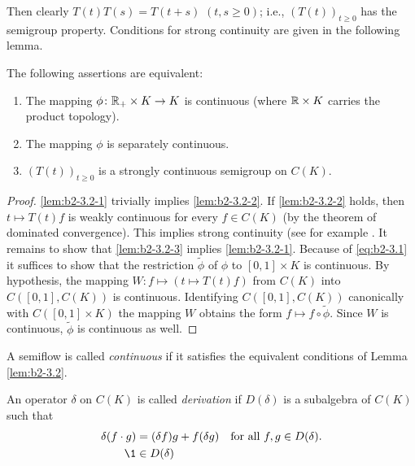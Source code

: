 Then clearly $T(t)T(s) = T(t+s)$ $(t,s\geq 0)$; i.e., $(T(t))_{t \geq 0}$ has the
semigroup property.
Conditions for strong continuity are given in the following lemma.

\begin{lemma}\label{lem:b2-3.2}
The following assertions are equivalent:
\begin{enumerate}[\upshape (a)]
\item \label{lem:b2-3.2-1}
The mapping $\phi \colon \mathbb{R}_{+} \times K \to K$ is continuous (where $\mathbb{R} \times K$ carries the product topology).
\item \label{lem:b2-3.2-2}
The mapping $\phi$ is separately continuous.
\item \label{lem:b2-3.2-3}
$(T(t))_{t \geq 0}$ is a strongly continuous semigroup on $C(K)$.
\end{enumerate}
\end{lemma}

\begin{proof}
\ref{lem:b2-3.2-1} trivially implies \ref{lem:b2-3.2-2}.
If \ref{lem:b2-3.2-2} holds, then $t \mapsto T(t)f$ is weakly continuous for every $f \in C(K)$ (by the theorem of dominated convergence).
This implies strong continuity (see for example \citet[Proposition 1.23]{davies:1980}.
It remains to show that \ref{lem:b2-3.2-3} implies \ref{lem:b2-3.2-1}.
Because of \eqref{eq:b2-3.1} it suffices to show that the restriction $\tilde{\phi}$ of $\phi$ to $[0,1] \times K$ is continuous.
By hypothesis, the mapping $W \colon f \mapsto (t \mapsto T(t)f)$ from $C(K)$ into $C([0,1],C(K))$ is continuous.
Identifying $C([0,1],C(K))$ canonically with $C([0,1] \times K)$ the mapping $W$ obtains the form $f \mapsto f \circ \tilde{\phi}$.
Since $W$ is continuous, $\tilde{\phi}$ is continuous as well.
\end{proof}

A semiflow is called \emph{continuous} if it satisfies the equivalent conditions of Lemma \ref{lem:b2-3.2}.

\begin{definition}\label{def:b2-3.3}
An operator $\delta$ on $C(K)$ is called \emph{derivation} if $D(\delta)$ is a subalgebra of $C(K)$ such that
\begin{align}
\delta(f \cdot g) &= (\delta f)g + f(\delta g) \quad \text{for all } f,g \in D(\delta). \label{eq:b2-3.4} \\
\1 &\in D(\delta) \label{eq:b2-3.5}
\end{align}
\end{definition}

